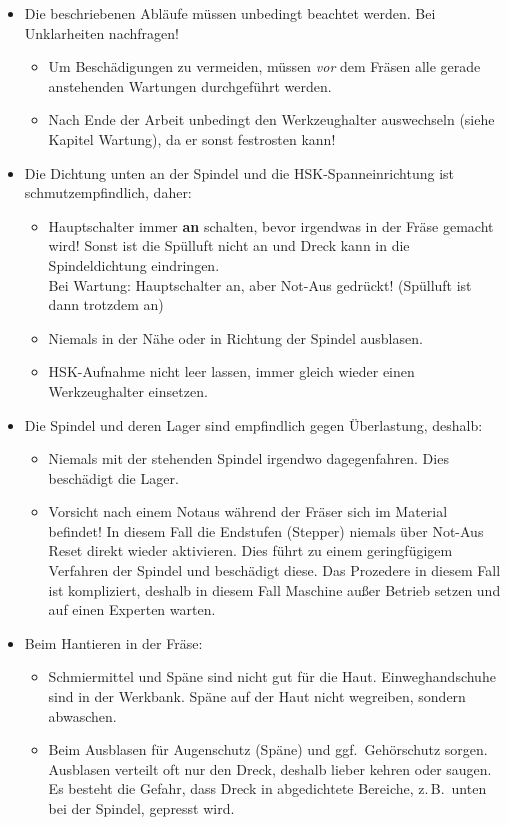\documentclass{\basedir/fablab-document}
\begin{document}
\begin{itemize}
 \item Die beschriebenen Abläufe müssen unbedingt beachtet werden. Bei Unklarheiten nachfragen!
	\begin{itemize}
	\item Um Beschädigungen zu vermeiden, müssen \emph{vor} dem Fräsen alle gerade anstehenden Wartungen durchgeführt werden.
	\item Nach Ende der Arbeit unbedingt den Werkzeughalter auswechseln (siehe Kapitel Wartung), da er sonst festrosten kann!
	\end{itemize}
 \item Die Dichtung unten an der Spindel und die HSK-Spanneinrichtung ist schmutzempfindlich, daher:
 \begin{itemize}
  \item Hauptschalter immer \textbf{an} schalten, bevor irgendwas in der Fräse gemacht wird! Sonst ist die Spülluft nicht an und Dreck kann in die Spindeldichtung eindringen.\\Bei Wartung: Hauptschalter an, aber Not-Aus gedrückt! (Spülluft ist dann trotzdem an)
  \item Niemals in der Nähe oder in Richtung der Spindel ausblasen.
  \item HSK-Aufnahme nicht leer lassen, immer gleich wieder einen Werkzeughalter einsetzen.
 \end{itemize}
\item Die Spindel und deren Lager sind empfindlich gegen Überlastung, deshalb: 
 \begin{itemize}
  \item Niemals mit der stehenden Spindel irgendwo dagegenfahren. Dies beschädigt die Lager.
  \item Vorsicht nach einem Notaus während der Fräser sich im Material befindet! In diesem Fall die Endstufen (Stepper) niemals über Not-Aus Reset direkt wieder aktivieren. Dies führt zu einem geringfügigem Verfahren der Spindel und beschädigt diese. 
Das Prozedere in diesem Fall ist kompliziert, deshalb in diesem Fall Maschine außer Betrieb setzen und auf einen Experten warten.
\end{itemize}
	\item Beim Hantieren in der Fräse:
\begin{itemize}
	\item Schmiermittel und Späne sind nicht gut für die Haut. Einweghandschuhe sind in der Werkbank. Späne auf der Haut nicht wegreiben, sondern abwaschen.
	\item Beim Ausblasen für Augenschutz (Späne) und ggf.\  Gehörschutz sorgen. Ausblasen verteilt oft nur den Dreck, deshalb lieber kehren oder saugen. Es besteht die Gefahr, dass Dreck in abgedichtete Bereiche, z.\,B.\  unten bei der Spindel, gepresst wird.

\end{itemize}
\end{itemize}
\end{document}
